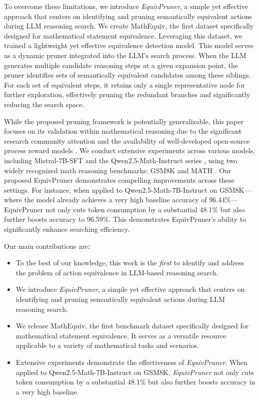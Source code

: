 \documentclass[11pt]{article}
\begin{document}
To overcome these limitations, we introduce \textit{EquivPruner}, a simple yet effective approach that centers on identifying and pruning semantically equivalent actions during LLM reasoning search. 
We create MathEquiv, the first dataset specifically designed for mathematical statement equivalence. 
Leveraging this dataset, we trained a lightweight yet effective equivalence detection model. This model serves as a dynamic pruner integrated into the LLM's search process. When the LLM generates multiple candidate reasoning steps at a given expansion point, the pruner identifies sets of semantically equivalent candidates among these siblings. For each set of equivalent steps, it retains only a single representative node for further exploration, effectively pruning the redundant branches and significantly reducing the search space.

While the proposed pruning framework is potentially generalizable, this paper focuses on its validation within mathematical reasoning due to the significant research community attention \citep{ke2025survey} and the availability of well-developed open-source process reward models \citep{shao2024deepseekmath}.
We conduct extensive experiments across various models, including Mistral-7B-SFT \citep{shao2024deepseekmath} and the Qwen2.5-Math-Instruct series \citep{yang2024qwen2}, using two widely recognized math reasoning benchmarks: GSM8K \citep{cobbe2021training} and MATH \citep{hendrycks2021math}.
Our proposed EquivPruner demonstrates compelling improvements across these settings. For instance, when applied to Qwen2.5-Math-7B-Instruct on GSM8K—where the model already achieves a very high baseline accuracy of 96.44\%—EquivPruner not only cuts token consumption by a substantial 48.1\% but also further boosts accuracy to 96.59\%. This demonstrates EquivPruner's ability to significantly enhance searching efficiency.

Our main contributions are:
\begin{itemize}
\item To the best of our knowledge, this work is the \textit{first} to identify and address the problem of action equivalence in LLM-based reasoning search.
\item We introduce \textit{EquivPruner}, a simple yet effective approach that centers on identifying and pruning semantically equivalent actions during LLM reasoning search.
\item We release MathEquiv, the first benchmark dataset specifically designed for mathematical statement equivalence. It serves as a versatile resource applicable to a variety of mathematical tasks and scenarios.
\item Extensive experiments demonstrate the effectiveness of \textit{EquivPruner}.
When applied to Qwen2.5-Math-7B-Instruct on GSM8K, \textit{EquivPruner} not only cuts token consumption by a substantial 48.1\% but also further boosts accuracy in a very high baseline.
\end{itemize}
\end{document}
